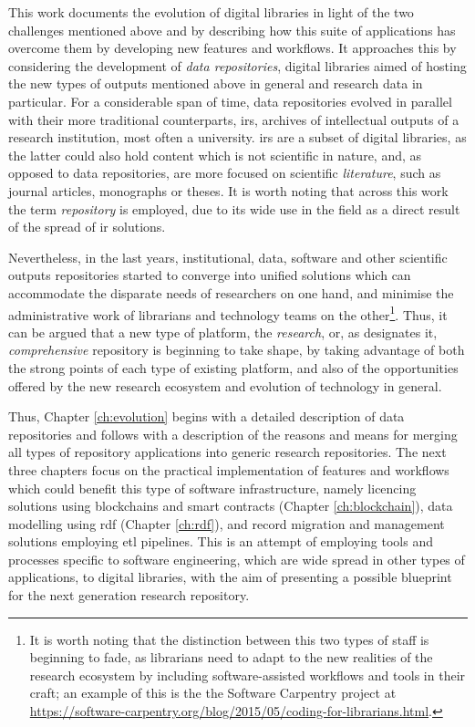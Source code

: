 This work documents the evolution of digital libraries in light of the two challenges mentioned above and by describing how this suite of applications has overcome them by developing new features and workflows. It approaches this by considering the development of \emph{data repositories}, digital libraries aimed of hosting the new types of outputs mentioned above in general and research data in particular. For a considerable span of time, data repositories evolved in parallel with their more traditional counterparts, \glspl{ir}, archives of intellectual outputs of a research institution, most often a university. \glspl{ir} are a subset of digital libraries, as the latter could also hold content which is not scientific in nature, and, as opposed to data repositories, are more focused on scientific \emph{literature}, such as journal articles, monographs or theses. It is worth noting that across this work the term \emph{repository} is employed, due to its wide use in the field as a direct result of the spread of \gls{ir} solutions.

Nevertheless, in the last years, institutional, data, software and other scientific outputs repositories started to converge into unified solutions which can accommodate the disparate needs of researchers on one hand, and minimise the administrative work of librarians and technology teams on the other\footnote{It is worth noting that the distinction between this two types of staff is beginning to fade, as librarians need to adapt to the new realities of the research ecosystem by including software-assisted workflows and tools in their craft; an example of this is the the Software Carpentry project at \url{https://software-carpentry.org/blog/2015/05/coding-for-librarians.html}.}. Thus, it can be argued that a new type of platform, the \emph{research}, or, as \cite{cmu} designates it, \emph{comprehensive} repository is beginning to take shape, by taking advantage of both the strong points of each type of existing platform, and also of the opportunities offered by the new research ecosystem and evolution of technology in general.

Thus, Chapter \ref{ch:evolution} begins with a detailed description of data repositories and follows with a description of the reasons and means for merging all types of repository applications into generic research repositories. The next three chapters focus on the practical implementation of features and workflows which could benefit this type of software infrastructure, namely licencing solutions using blockchains and smart contracts (Chapter \ref{ch:blockchain}), data modelling using \gls{rdf} (Chapter \ref{ch:rdf}), and record migration and management solutions employing \gls{etl} pipelines. This is an attempt of employing tools and processes specific to software engineering, which are wide spread in other types of applications, to digital libraries, with the aim of presenting a possible blueprint for the next generation research repository.
